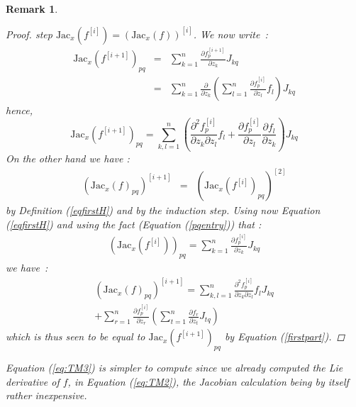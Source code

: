 \documentclass{sig-alternate-05-2015} %
\newtheorem{remark}{Remark}
\begin{document}
\begin{remark}
\begin{proof}
step $\mbox{Jac}_x(f^{[i]})=(\mbox{Jac}_x(f))^{[i]}$. We now write~:
$$\begin{array}{rcl}
\mbox{Jac}_x(f^{[i+1]})_{pq} & = & \sum\limits_{k=1}^n \frac{\partial f^{[i+1]}_p}{\partial z_k} J_{kq} \\
 & = & \sum\limits_{k=1}^n \frac{\partial}{\partial z_k} \left(
\sum\limits_{l=1}^n \frac{\partial{f^{[i]}_p}}{\partial z_l} f_l
\right)J_{kq}
\end{array}$$
\noindent hence, 
\begin{equation}
\mbox{Jac}_x(f^{[i+1]})_{pq} =  \sum\limits_{k,l=1}^n \left(\frac{\partial^2 f_p^{[i]}}{\partial z_k \partial z_l} f_l
+\frac{\partial f_p^{[i]}}{\partial z_l}\frac{\partial f_l}{\partial z_k}\right)
J_{kq}
\label{firstpart}
\end{equation}
On the other hand we have : 
$$\begin{array}{rcl}
(\mbox{Jac}_x(f)_{pq})^{[i+1]} & = &
(\mbox{Jac}_x(f^{[i]})_{pq})^{[2]}
\end{array}$$
\noindent by Definition (\ref{eqfirstH}) and by the induction step. 
Using now Equation (\ref{eqfirstH}) and using the fact (Equation (\ref{pqentry})) that :
$$\begin{array}{rcl}
(\mbox{Jac}_x(f^{[i]}))_{pq} = \sum\limits_{k=1}^n \frac{\partial f^{[i]}_p}{\partial z_k} J_{kq}
\end{array}$$
\noindent we have~:  
\begin{multline}
(\mbox{Jac}_x(f)_{pq})^{[i+1]}  = 
\sum\limits_{k,l=1}^n \frac{\partial^2 f_p^{[i]}}{\partial z_k \partial z_l} f_l J_{kq} \\
+ \sum\limits_{r=1}^n \frac{\partial f_p^{[i]}}{\partial z_r}\left(\sum\limits_{t=1}^n
\frac{\partial f_r}{\partial z_t} J_{tq} \right)
\end{multline}
\noindent which is thus seen to be equal to $\mbox{Jac}_x(f^{[i+1]})_{pq}$ by
Equation (\ref{firstpart}). 
\end{proof}

Equation (\ref{eq:TM3}) 
is simpler to compute since we already computed
the Lie derivative of $f$, in Equation (\ref{eq:TM2}), the Jacobian calculation being by
itself rather 
inexpensive. 
\end{remark}
\end{document}
